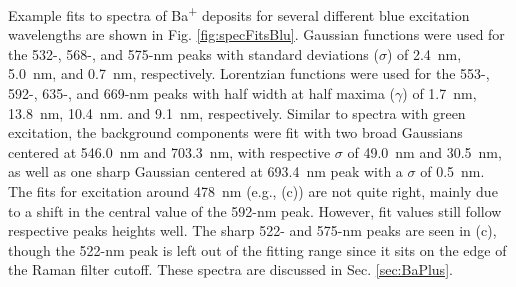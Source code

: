 Example fits to spectra of Ba\textsuperscript{+} deposits for several different blue excitation wavelengths are shown in Fig. \ref{fig:specFitsBlu}.  Gaussian functions were used for the 532-, 568-, and 575-nm peaks with standard deviations ($\sigma$) of 2.4~nm, 5.0~nm, and 0.7~nm, respectively.  Lorentzian functions were used for the 553-, 592-, 635-, and 669-nm peaks with half width at half maxima ($\gamma$) of 1.7~nm, 13.8~nm, 10.4~nm. and 9.1~nm, respectively.  Similar to spectra with green excitation, the background components were fit with two broad Gaussians centered at 546.0~nm and 703.3~nm, with respective $\sigma$ of 49.0~nm and 30.5~nm, as well as one sharp Gaussian centered at 693.4~nm peak with a $\sigma$ of 0.5~nm.  The fits for excitation around 478~nm (e.g., (c)) are not quite right, mainly due to a shift in the central value of the 592-nm peak.  However, fit values still follow respective peaks heights well.  The sharp 522- and 575-nm peaks are seen in (c), though the 522-nm peak is left out of the fitting range since it sits on the edge of the Raman filter cutoff.   These spectra are discussed in Sec. \ref{sec:BaPlus}.


